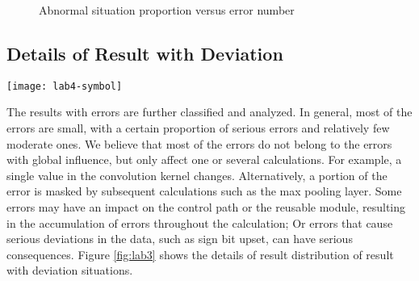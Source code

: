 \begin{figure}
    \centering
    \caption{Abnormal situation proportion versus error number}
\label{fig:lab2_2}
\vspace{-0.5em}
\end{figure}


\subsection{Details of Result with Deviation}

\begin{figure*}
    \centering
\caption{Distribution of result with deviation situations}
\label{fig:lab3}
\vspace{-0.5em}
\end{figure*}

\begin{figure*}
    \centering
    \texttt{[image: lab4-symbol]}
\caption{Proportion of different error location}
\label{fig:lab4}
\vspace{-0.5em}
\end{figure*}

The results with errors are further classified and analyzed. In general, most of the errors are small, with a certain proportion of serious errors and relatively few moderate ones. We believe that most of the errors do not belong to the errors with global influence, but only affect one or several calculations. For example, a single value in the convolution kernel changes. Alternatively, a portion of the error is masked by subsequent calculations such as the max pooling layer. Some errors may have an impact on the control path or the reusable module, resulting in the accumulation of errors throughout the calculation; Or errors that cause serious deviations in the data, such as sign bit upset, can have serious consequences. Figure \ref{fig:lab3} shows the details of result distribution of result with deviation situations.

